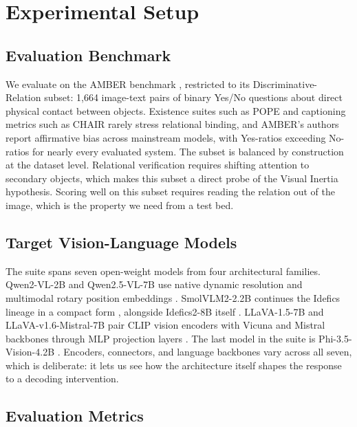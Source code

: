 \documentclass{ieeeaccess}
\begin{document}
\section{Experimental Setup}\label{sec:experiments}

\subsection{Evaluation Benchmark}\label{subsec:benchmark}

We evaluate on the AMBER benchmark \cite{wang2023amber}, restricted to its Discriminative-Relation subset: 1,664 image-text pairs of binary Yes/No questions about direct physical contact between objects. Existence suites such as POPE \cite{li2023bevaluating} and captioning metrics such as CHAIR \cite{rohrbach2018object} rarely stress relational binding, and AMBER's authors report affirmative bias across mainstream models, with Yes-ratios exceeding No-ratios for nearly every evaluated system. The subset is balanced by construction at the dataset level. Relational verification requires shifting attention to secondary objects, which makes this subset a direct probe of the Visual Inertia hypothesis. Scoring well on this subset requires reading the relation out of the image, which is the property we need from a test bed.

\subsection{Target Vision-Language Models}\label{subsec:models}

The suite spans seven open-weight models from four architectural families. Qwen2-VL-2B and Qwen2.5-VL-7B use native dynamic resolution and multimodal rotary position embeddings \cite{bai2025qwen25vl}. SmolVLM2-2.2B continues the Idefics lineage in a compact form \cite{marafioti2025smolvlm,laurencon2024matters}, alongside Idefics2-8B itself \cite{laurencon2024matters}. LLaVA-1.5-7B and LLaVA-v1.6-Mistral-7B pair CLIP vision encoders with Vicuna and Mistral backbones through MLP projection layers \cite{liu2023visual,liu2024improved}. The last model in the suite is Phi-3.5-Vision-4.2B \cite{abdin2024phi3}. Encoders, connectors, and language backbones vary across all seven, which is deliberate: it lets us see how the architecture itself shapes the response to a decoding intervention.

\subsection{Evaluation Metrics}\label{subsec:metrics}
\end{document}
